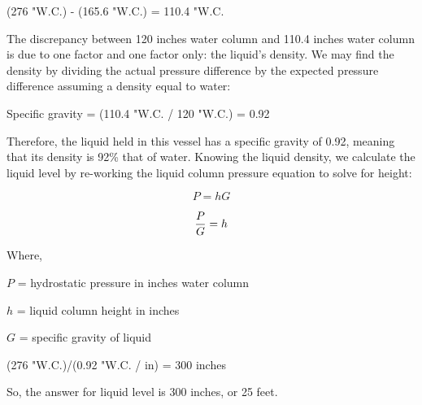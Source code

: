 \vskip 10pt

(276 "W.C.) - (165.6 "W.C.) = 110.4 "W.C.

\vskip 10pt

The discrepancy between 120 inches water column and 110.4 inches water column is due to one factor and one factor only: the liquid's density.  We may find the density by dividing the actual pressure difference by the expected pressure difference assuming a density equal to water:

\vskip 10pt

Specific gravity = (110.4 "W.C. / 120 "W.C.) = 0.92

\vskip 10pt

Therefore, the liquid held in this vessel has a specific gravity of 0.92, meaning that its density is 92\% that of water.  Knowing the liquid density, we calculate the liquid level by re-working the liquid column pressure equation to solve for height:

$$P = hG$$

$${P \over G} = h$$

\noindent
Where,

$P$ = hydrostatic pressure in inches water column

$h$ = liquid column height in inches

$G$ = specific gravity of liquid

\vskip 10pt

(276 "W.C.)/(0.92 "W.C. / in) = 300 inches

\vskip 10pt

So, the answer for liquid level is 300 inches, or 25 feet.











